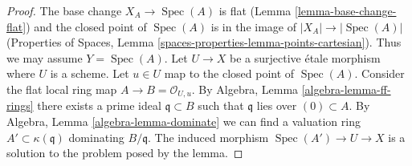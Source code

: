 \documentclass[10pt,a4paper]{amsart}
\theoremstyle{plain}
\theoremstyle{definition}
\theoremstyle{remark}
\numberwithin{equation}{subsection}
\def\Spec{\mathop{\mathrm{Spec}}}
\begin{document}
\begin{proof}
The base change $X_A \to \Spec(A)$ is flat
(Lemma \ref{lemma-base-change-flat}) and the closed point of
$\Spec(A)$ is in the image of $|X_A| \to |\Spec(A)|$
(Properties of Spaces, Lemma \ref{spaces-properties-lemma-points-cartesian}).
Thus we may assume $Y = \Spec(A)$. Let $U \to X$ be a surjective
\'etale morphism where $U$ is a scheme. Let $u \in U$ map to
the closed point of $\Spec(A)$. Consider the flat local ring map
$A \to B = \mathcal{O}_{U, u}$. By
Algebra, Lemma \ref{algebra-lemma-ff-rings}
there exists a prime ideal $\mathfrak q \subset B$ such that
$\mathfrak q$ lies over $(0) \subset A$. By
Algebra, Lemma \ref{algebra-lemma-dominate}
we can find a valuation ring $A' \subset \kappa(\mathfrak q)$
dominating $B/\mathfrak q$. The induced morphism
$\Spec(A') \to U \to X$ is a solution to the problem
posed by the lemma.
\end{proof}
\end{document}
